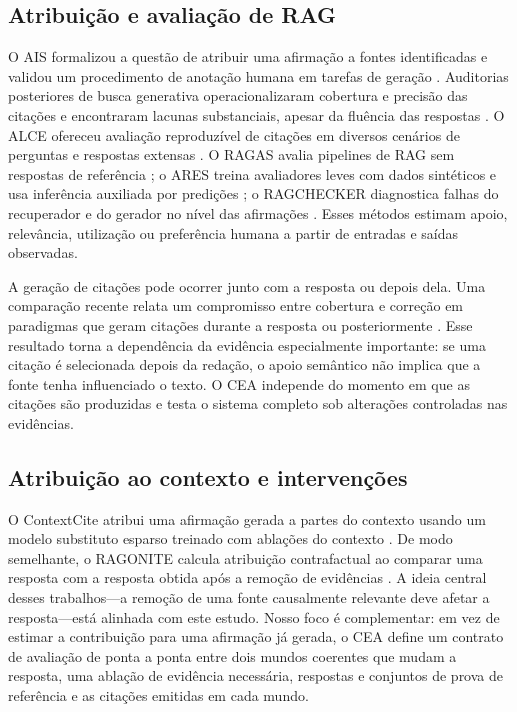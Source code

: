 \documentclass[10pt,twocolumn]{article}
\newcommand{\method}{\textsc{CEA}}
\begin{document}
\subsection{Atribuição e avaliação de RAG}

O AIS formalizou a questão de atribuir uma afirmação a fontes identificadas e validou um procedimento de anotação humana em tarefas de geração \citep{rashkin2021ais}. Auditorias posteriores de busca generativa operacionalizaram cobertura e precisão das citações e encontraram lacunas substanciais, apesar da fluência das respostas \citep{liu2023verifiability}. O ALCE ofereceu avaliação reproduzível de citações em diversos cenários de perguntas e respostas extensas \citep{gao2023alce}. O RAGAS avalia pipelines de RAG sem respostas de referência \citep{es2023ragas}; o ARES treina avaliadores leves com dados sintéticos e usa inferência auxiliada por predições \citep{saadfalcon2023ares}; o RAGCHECKER diagnostica falhas do recuperador e do gerador no nível das afirmações \citep{ru2024ragchecker}. Esses métodos estimam apoio, relevância, utilização ou preferência humana a partir de entradas e saídas observadas.

A geração de citações pode ocorrer junto com a resposta ou depois dela. Uma comparação recente relata um compromisso entre cobertura e correção em paradigmas que geram citações durante a resposta ou posteriormente \citep{saxena2025citation}. Esse resultado torna a dependência da evidência especialmente importante: se uma citação é selecionada depois da redação, o apoio semântico não implica que a fonte tenha influenciado o texto. O \method{} independe do momento em que as citações são produzidas e testa o sistema completo sob alterações controladas nas evidências.

\subsection{Atribuição ao contexto e intervenções}

O ContextCite atribui uma afirmação gerada a partes do contexto usando um modelo substituto esparso treinado com ablações do contexto \citep{cohenwang2024contextcite}. De modo semelhante, o RAGONITE calcula atribuição contrafactual ao comparar uma resposta com a resposta obtida após a remoção de evidências \citep{saharoy2024ragonite}. A ideia central desses trabalhos---a remoção de uma fonte causalmente relevante deve afetar a resposta---está alinhada com este estudo. Nosso foco é complementar: em vez de estimar a contribuição para uma afirmação já gerada, o \method{} define um contrato de avaliação de ponta a ponta entre dois mundos coerentes que mudam a resposta, uma ablação de evidência necessária, respostas e conjuntos de prova de referência e as citações emitidas em cada mundo.
\end{document}
